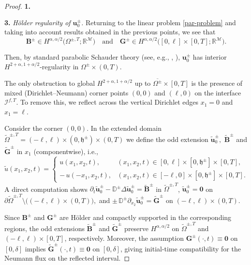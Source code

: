\documentclass[reqno]{amsart}            %
\numberwithin{equation}{section}
\begin{document}
\begin{proof} {\bf 1.}
		\smallskip
		
		\noindent
		\textbf{3.} \emph{H\"older regularity of $\mathbf{u}^\pm_0$.} Returning to the linear problem \eqref{par-problem} and taking into account results obtained in the previous points, we see that   
		$$
		\mathbf{B}^\pm \in H^{\alpha,\alpha/2}\big(\Omega^{\pm, T}; \mathbb{R}^\mathcal{M}\big) \quad \text{and} \quad \mathbf{G}^\pm \in  H^{\alpha,\alpha/2}\big([0,\ell]\times[0,T]; \mathbb{R}^\mathcal{M}\big). 
		$$
		
		Then, by standard parabolic Schauder theory (see, e.g., \cite[Ch.~IV]{Lad_Sol_Ura_1968}, \cite[Ch.~IV]{Lieberman}), $\mathbf{u}_0^\pm$ has interior $H^{2+\alpha,1+\alpha/2}$-regularity in $\Omega^\pm\times(0,T)$.
		
		The only obstruction to global $H^{2+\alpha,1+\alpha/2}$ up to $\overline{\Omega^\pm}\times[0,T]$ is the presence of mixed (Dirichlet–Neumann) corner points $(0,0)$ and $(\ell,0)$ on the interface $\mathcal{I}^{f,T}$. To remove this, we reflect across the vertical Dirichlet edges $x_1=0$ and $x_1=\ell$.
		
		Consider the corner $(0,0).$ In the extended domain $\widetilde{\Omega}^{\pm, T} = (-\ell, \ell)\times (0,\mathfrak{h}^\pm) \times (0,T)$ we define the odd extension $\widetilde{\mathbf{u}}^\pm_0,$ $\widetilde{\mathbf{B}}^\pm$ and $\widetilde{\mathbf{G}}^\pm$
		in $x_1$ (componentwise), i.e.,
		\[
		\widetilde{u}(x_1,x_2,t)=\begin{cases}
			u(x_1,x_2,t), & (x_1,x_2,t)\in [0, \ell]\times [0,\mathfrak{h}^\pm] \times [0,T],
			\\
			-\,u(-x_1,x_2,t), & (x_1,x_2,t) \in [-\ell, 0]\times [0,\mathfrak{h}^\pm] \times [0,T].
		\end{cases} 
		\]
		A direct computation shows 
		$\partial_t \widetilde{\mathbf{u}}^\pm_0 - \mathbb{D}^\pm \Delta\widetilde{\mathbf{u}}^\pm_0
		=  \widetilde{\mathbf{B}}^\pm$ in $\widetilde{\Omega}^{\pm, T}$, $\widetilde{\mathbf{u}}^\pm_0 = \mathbf{0}$ on 
		$\partial\widetilde{\Omega}^{\pm,T} \setminus \big((-\ell,\ell) \times(0,T)\big),$ and
		$\pm\, \mathbb{D}^\pm \partial_{x_2}\widetilde{\mathbf{u}}^\pm_0 = \widetilde{\mathbf{G}}^\pm$ on  $(-\ell,\ell)\times (0,T)$. 
		
		Since $\mathbf{B}^\pm$ and $\mathbf{G}^\pm$ are Hölder and compactly supported in the corresponding regions, the odd extensions $\widetilde{\mathbf{B}}^\pm$ and $\widetilde{\mathbf{G}}^\pm$ 
		preserve $H^{\alpha,\alpha/2}$ on $\widetilde{\Omega}^{\pm,T}$ and $(-\ell,\ell)\times[0,T]$, respectively. Moreover, the assumption $\mathbf{G}^\pm(\cdot,t)\equiv \mathbf{0}$ on $[0,\delta]$ implies $\widetilde{\mathbf{G}}^\pm(\cdot,t)\equiv \mathbf{0}$ on $[0,\delta]$, giving initial-time compatibility for the Neumann flux on the reflected interval.
		

\end{proof}
\end{document}

